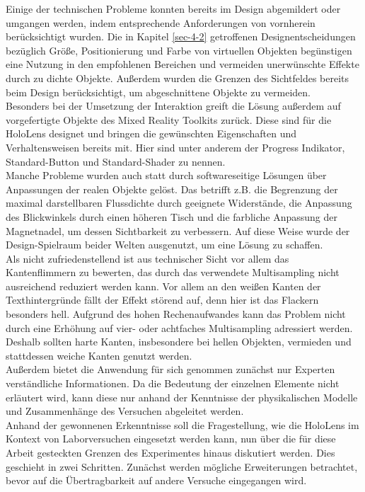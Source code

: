 Einige der technischen Probleme konnten bereits im Design abgemildert oder umgangen werden, indem entsprechende Anforderungen von vornherein berücksichtigt wurden. Die in Kapitel \ref{sec-4-2} getroffenen Designentscheidungen bezüglich Größe, Positionierung und Farbe von virtuellen Objekten begünstigen eine Nutzung in den empfohlenen Bereichen und vermeiden unerwünschte Effekte durch zu dichte Objekte. Außerdem wurden die Grenzen des Sichtfeldes bereits beim Design berücksichtigt, um abgeschnittene Objekte zu vermeiden.\\
\noindent\hspace*{5mm}
Besonders bei der Umsetzung der Interaktion greift die Lösung außerdem auf vorgefertigte Objekte des Mixed Reality Toolkits zurück. Diese sind für die HoloLens designet und bringen die gewünschten Eigenschaften und Verhaltensweisen bereits mit. Hier sind unter anderem der Progress Indikator, Standard-Button und Standard-Shader zu nennen.\\

Manche Probleme wurden auch statt durch softwareseitige Lösungen über Anpassungen der realen Objekte gelöst. Das betrifft z.B. die Begrenzung der maximal darstellbaren Flussdichte durch geeignete Widerstände, die Anpassung des Blickwinkels durch einen höheren Tisch und die farbliche Anpassung der Magnetnadel, um dessen Sichtbarkeit zu verbessern. Auf diese Weise wurde der Design-Spielraum beider Welten ausgenutzt, um eine Lösung zu schaffen.\\

Als nicht zufriedenstellend ist aus technischer Sicht vor allem das Kantenflimmern zu bewerten, das durch das verwendete Multisampling nicht ausreichend reduziert werden kann. Vor allem an den weißen Kanten der Texthintergründe fällt der Effekt störend auf, denn hier ist das Flackern besonders hell. Aufgrund des hohen Rechenaufwandes kann das Problem nicht durch eine Erhöhung auf vier- oder achtfaches Multisampling adressiert werden. Deshalb sollten harte Kanten, insbesondere bei hellen Objekten, vermieden und stattdessen weiche Kanten genutzt werden.\\

Außerdem bietet die Anwendung für sich genommen zunächst nur Experten verständliche Informationen. Da die Bedeutung der einzelnen Elemente nicht erläutert wird, kann diese nur anhand der Kenntnisse der physikalischen Modelle und Zusammenhänge des Versuchen abgeleitet werden.\\

Anhand der gewonnenen Erkenntnisse soll die Fragestellung, wie die HoloLens im Kontext von Laborversuchen eingesetzt werden kann, nun über die für diese Arbeit gesteckten Grenzen des Experimentes hinaus diskutiert werden. Dies geschieht in zwei Schritten. Zunächst werden mögliche Erweiterungen betrachtet, bevor auf die Übertragbarkeit auf andere Versuche eingegangen wird.

